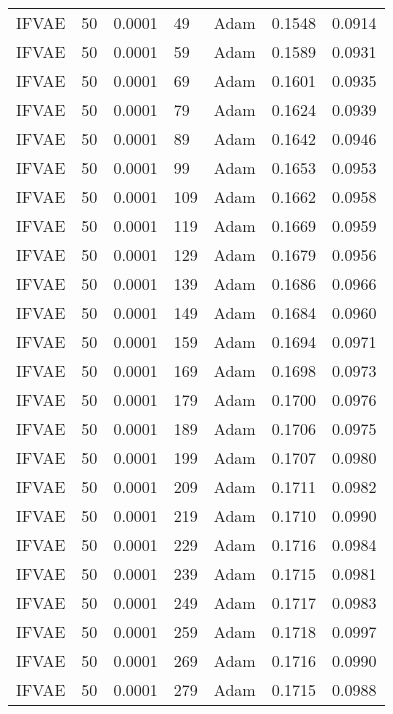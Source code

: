\begin{tabular}{llrllrr}
 IFVAE &   50 &  0.0001 &    49 &      Adam &  0.1548 &       0.0914 \\
 IFVAE &   50 &  0.0001 &    59 &      Adam &  0.1589 &       0.0931 \\
 IFVAE &   50 &  0.0001 &    69 &      Adam &  0.1601 &       0.0935 \\
 IFVAE &   50 &  0.0001 &    79 &      Adam &  0.1624 &       0.0939 \\
 IFVAE &   50 &  0.0001 &    89 &      Adam &  0.1642 &       0.0946 \\
 IFVAE &   50 &  0.0001 &    99 &      Adam &  0.1653 &       0.0953 \\
 IFVAE &   50 &  0.0001 &   109 &      Adam &  0.1662 &       0.0958 \\
 IFVAE &   50 &  0.0001 &   119 &      Adam &  0.1669 &       0.0959 \\
 IFVAE &   50 &  0.0001 &   129 &      Adam &  0.1679 &       0.0956 \\
 IFVAE &   50 &  0.0001 &   139 &      Adam &  0.1686 &       0.0966 \\
 IFVAE &   50 &  0.0001 &   149 &      Adam &  0.1684 &       0.0960 \\
 IFVAE &   50 &  0.0001 &   159 &      Adam &  0.1694 &       0.0971 \\
 IFVAE &   50 &  0.0001 &   169 &      Adam &  0.1698 &       0.0973 \\
 IFVAE &   50 &  0.0001 &   179 &      Adam &  0.1700 &       0.0976 \\
 IFVAE &   50 &  0.0001 &   189 &      Adam &  0.1706 &       0.0975 \\
 IFVAE &   50 &  0.0001 &   199 &      Adam &  0.1707 &       0.0980 \\
 IFVAE &   50 &  0.0001 &   209 &      Adam &  0.1711 &       0.0982 \\
 IFVAE &   50 &  0.0001 &   219 &      Adam &  0.1710 &       0.0990 \\
 IFVAE &   50 &  0.0001 &   229 &      Adam &  0.1716 &       0.0984 \\
 IFVAE &   50 &  0.0001 &   239 &      Adam &  0.1715 &       0.0981 \\
 IFVAE &   50 &  0.0001 &   249 &      Adam &  0.1717 &       0.0983 \\
 IFVAE &   50 &  0.0001 &   259 &      Adam &  0.1718 &       0.0997 \\
 IFVAE &   50 &  0.0001 &   269 &      Adam &  0.1716 &       0.0990 \\
 IFVAE &   50 &  0.0001 &   279 &      Adam &  0.1715 &       0.0988 \\

\end{tabular}
